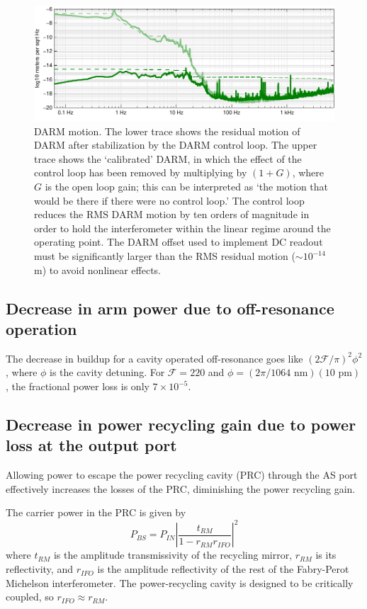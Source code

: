 \begin{figure}[p]
\centerline{\includegraphics[width=\columnwidth]{figures/residualDARM.pdf}}
\caption[Residual DARM motion]{\label{fig:residual-DARM}DARM
  motion. The lower trace shows the residual motion of DARM after
  stabilization by the DARM control loop.  The upper trace shows the
  `calibrated' DARM, in which the effect of the control loop has been
  removed by multiplying by $(1+G)$, where $G$ is the open loop gain;
  this can be interpreted as `the motion that would be there if there
  were no control loop.'  The control loop reduces the RMS DARM motion
  by ten orders of magnitude in order to hold the interferometer
  within the linear regime around the operating point.  The DARM
  offset used to implement DC readout must be significantly larger
  than the RMS residual motion ($\sim10^{-14}$ m) to avoid
  nonlinear effects.}
\end{figure}


\subsection{Decrease in arm power due to off-resonance operation}
The decrease in buildup for a cavity operated off-resonance goes like
$(2\mathcal{F}/\pi)^2\phi^2$, where $\phi$ is the cavity detuning.
For $\mathcal{F}=220$ and $\phi=(2\pi/1064\text{ nm})(10\text{ pm})$,
the fractional power loss is only $7\times10^{-5}$.

\subsection{Decrease in power recycling gain due to power loss at the output port}

Allowing power to escape the power recycling cavity (PRC) through the
AS port effectively increases the losses of the PRC, diminishing the
power recycling gain.

The carrier power in the PRC is given by
\begin{equation}
P_{BS} = P_{IN}\left| \frac{t_{RM}}{1 - r_{RM} r_{IFO}}\right|^2
\end{equation}
where $t_{RM}$ is the amplitude transmissivity of the recycling
mirror, $r_{RM}$ is its reflectivity, and $r_{IFO}$ is the amplitude
reflectivity of the rest of the Fabry-Perot Michelson interferometer.
The power-recycling cavity is designed to be critically coupled, so
$r_{IFO}\approx r_{RM}$.

